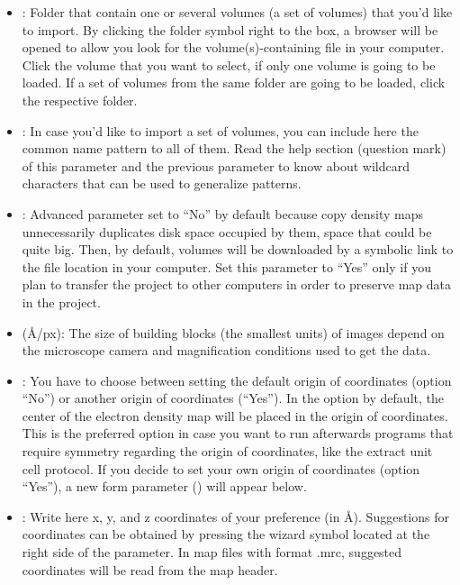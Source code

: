 \begin{itemize}
\begin{itemize}
  \begin{itemize}
   \item {}: Folder that contain one or several volumes (a set of volumes) that you'd like to import. By clicking the folder symbol right to the  box, a browser will be opened to allow you look for the volume(s)-containing file in your computer. Click the volume that you want to select, if only one volume is going to be loaded. If a set of volumes from the same folder are going to be loaded, click the respective folder.\\
   \item {}: In case you'd like to import a set of volumes, you can include here the common name pattern to all of them. Read the help section (question mark) of this parameter and the previous parameter  to know about wildcard characters that can be used to generalize patterns.\\
   \item {}: Advanced parameter set to ``No'' by default because copy density maps unnecessarily duplicates disk space occupied by them, space that could be quite big. Then, by default, volumes will be downloaded by a symbolic link to the file location in your computer. Set this parameter to ``Yes'' only if you plan to transfer the project to other computers in order to preserve map data in the \scipion project.\\
   \item {} (\AA/px): The size of building blocks (the smallest units) of images depend on the microscope camera and magnification conditions used to get the data.\\
   \item {}: You have to choose between setting the default origin of coordinates (option ``No'') or another origin of coordinates (``Yes''). In the option by default, the center of the electron density map will be placed in the origin of coordinates. This is the preferred option in case you want to run afterwards programs that require symmetry regarding the origin of coordinates, like the extract unit cell protocol. If you decide to set your own origin of coordinates (option ``Yes''), a new form parameter () will appear below.\\
   \item {}: Write here x, y, and z coordinates of your preference (in \AA). Suggestions for coordinates can be obtained by pressing the wizard symbol located at the right side of the  parameter. In map files with format .mrc, suggested coordinates will be read from the map header.\\
   \end{itemize}
   

\end{itemize}
\end{itemize}
